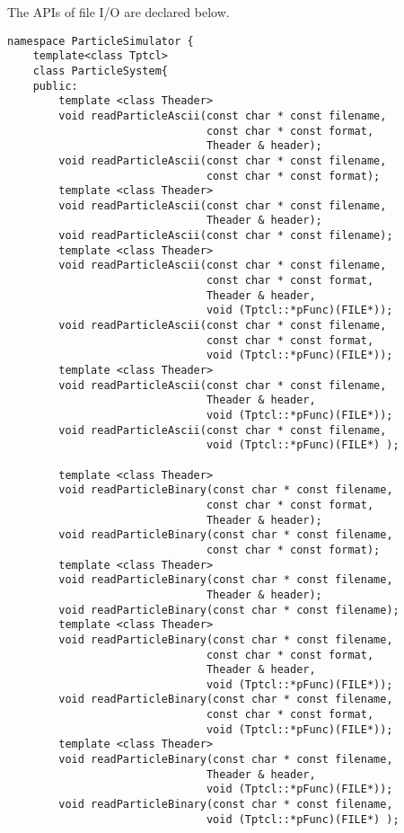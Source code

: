 \label{sec:ParticleSystem:IO}

The APIs of file I/O are declared below.
\begin{lstlisting}[caption=ParticleSystem3]
namespace ParticleSimulator {
    template<class Tptcl>
    class ParticleSystem{
    public:
        template <class Theader>
        void readParticleAscii(const char * const filename,
                               const char * const format,
                               Theader & header);
        void readParticleAscii(const char * const filename,       
                               const char * const format);
        template <class Theader>
        void readParticleAscii(const char * const filename,
                               Theader & header);
        void readParticleAscii(const char * const filename);
        template <class Theader>
        void readParticleAscii(const char * const filename,
                               const char * const format,
                               Theader & header,
                               void (Tptcl::*pFunc)(FILE*));
        void readParticleAscii(const char * const filename,       
                               const char * const format,
                               void (Tptcl::*pFunc)(FILE*));
        template <class Theader>
        void readParticleAscii(const char * const filename,
                               Theader & header,
                               void (Tptcl::*pFunc)(FILE*));
        void readParticleAscii(const char * const filename,
                               void (Tptcl::*pFunc)(FILE*) );

        template <class Theader>
        void readParticleBinary(const char * const filename,
                               const char * const format,
                               Theader & header);
        void readParticleBinary(const char * const filename,       
                               const char * const format);
        template <class Theader>
        void readParticleBinary(const char * const filename,
                               Theader & header);
        void readParticleBinary(const char * const filename);
        template <class Theader>
        void readParticleBinary(const char * const filename,
                               const char * const format,
                               Theader & header,
                               void (Tptcl::*pFunc)(FILE*));
        void readParticleBinary(const char * const filename,       
                               const char * const format,
                               void (Tptcl::*pFunc)(FILE*));
        template <class Theader>
        void readParticleBinary(const char * const filename,
                               Theader & header,
                               void (Tptcl::*pFunc)(FILE*));
        void readParticleBinary(const char * const filename,
                               void (Tptcl::*pFunc)(FILE*) );


\end{lstlisting}

